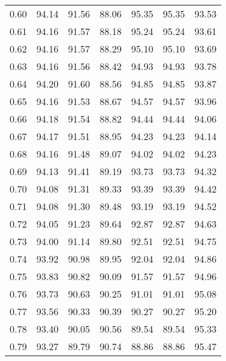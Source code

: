 \begin{tabular}{|c|c|c|c|c|c|c|}
      0.60 &     94.14 &     91.56 &      88.06 &   95.35 &      95.35 &         93.53 \\
      0.61 &     94.16 &     91.57 &      88.18 &   95.24 &      95.24 &         93.61 \\
      0.62 &     94.16 &     91.57 &      88.29 &   95.10 &      95.10 &         93.69 \\
      0.63 &     94.16 &     91.56 &      88.42 &   94.93 &      94.93 &         93.78 \\
      0.64 &     94.20 &     91.60 &      88.56 &   94.85 &      94.85 &         93.87 \\
      0.65 &     94.16 &     91.53 &      88.67 &   94.57 &      94.57 &         93.96 \\
      0.66 &     94.18 &     91.54 &      88.82 &   94.44 &      94.44 &         94.06 \\
      0.67 &     94.17 &     91.51 &      88.95 &   94.23 &      94.23 &         94.14 \\
      0.68 &     94.16 &     91.48 &      89.07 &   94.02 &      94.02 &         94.23 \\
      0.69 &     94.13 &     91.41 &      89.19 &   93.73 &      93.73 &         94.32 \\
      0.70 &     94.08 &     91.31 &      89.33 &   93.39 &      93.39 &         94.42 \\
      0.71 &     94.08 &     91.30 &      89.48 &   93.19 &      93.19 &         94.52 \\
      0.72 &     94.05 &     91.23 &      89.64 &   92.87 &      92.87 &         94.63 \\
      0.73 &     94.00 &     91.14 &      89.80 &   92.51 &      92.51 &         94.75 \\
      0.74 &     93.92 &     90.98 &      89.95 &   92.04 &      92.04 &         94.86 \\
      0.75 &     93.83 &     90.82 &      90.09 &   91.57 &      91.57 &         94.96 \\
      0.76 &     93.73 &     90.63 &      90.25 &   91.01 &      91.01 &         95.08 \\
      0.77 &     93.56 &     90.33 &      90.39 &   90.27 &      90.27 &         95.20 \\
      0.78 &     93.40 &     90.05 &      90.56 &   89.54 &      89.54 &         95.33 \\
      0.79 &     93.27 &     89.79 &      90.74 &   88.86 &      88.86 &         95.47 \\

\end{tabular}
